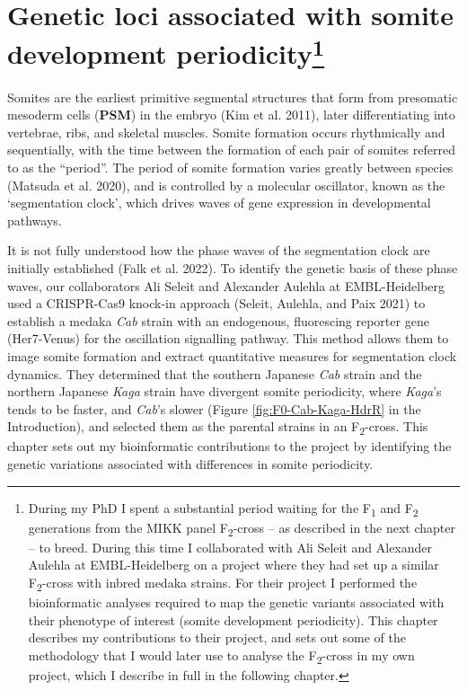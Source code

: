 \documentclass[
]{book}
\begin{document}
\hypertarget{Somite-chap}{%
\chapter[Genetic loci associated with somite development periodicity]{\texorpdfstring{Genetic loci associated with somite development periodicity\footnote{During my PhD I spent a substantial period waiting for the F\textsubscript{1} and F\textsubscript{2} generations from the MIKK panel F\textsubscript{2}-cross -- as described in the next chapter -- to breed. During this time I collaborated with Ali Seleit and Alexander Aulehla at EMBL-Heidelberg on a project where they had set up a similar F\textsubscript{2}-cross with inbred medaka strains. For their project I performed the bioinformatic analyses required to map the genetic variants associated with their phenotype of interest (somite development periodicity). This chapter describes my contributions to their project, and sets out some of the methodology that I would later use to analyse the F\textsubscript{2}-cross in my own project, which I describe in full in the following chapter.}}{Genetic loci associated with somite development periodicity}}\label{Somite-chap}}


Somites are the earliest primitive segmental structures that form from presomatic mesoderm cells (\textbf{PSM}) in the embryo (Kim et al. 2011), later differentiating into vertebrae, ribs, and skeletal muscles. Somite formation occurs rhythmically and sequentially, with the time between the formation of each pair of somites referred to as the ``period''. The period of somite formation varies greatly between species (Matsuda et al. 2020), and is controlled by a molecular oscillator, known as the `segmentation clock', which drives waves of gene expression in developmental pathways.

It is not fully understood how the phase waves of the segmentation clock are initially established (Falk et al. 2022). To identify the genetic basis of these phase waves, our collaborators Ali Seleit and Alexander Aulehla at EMBL-Heidelberg used a CRISPR-Cas9 knock-in approach (Seleit, Aulehla, and Paix 2021) to establish a medaka \emph{Cab} strain with an endogenous, fluorescing reporter gene (Her7-Venus) for the oscillation signalling pathway. This method allows them to image somite formation and extract quantitative measures for segmentation clock dynamics. They determined that the southern Japanese \emph{Cab} strain and the northern Japanese \emph{Kaga} strain have divergent somite periodicity, where \emph{Kaga}'s tends to be faster, and \emph{Cab}'s slower (Figure \ref{fig:F0-Cab-Kaga-HdrR} in the Introduction), and selected them as the parental strains in an F\textsubscript{2}-cross. This chapter sets out my bioinformatic contributions to the project by identifying the genetic variations associated with differences in somite periodicity.
\end{document}
